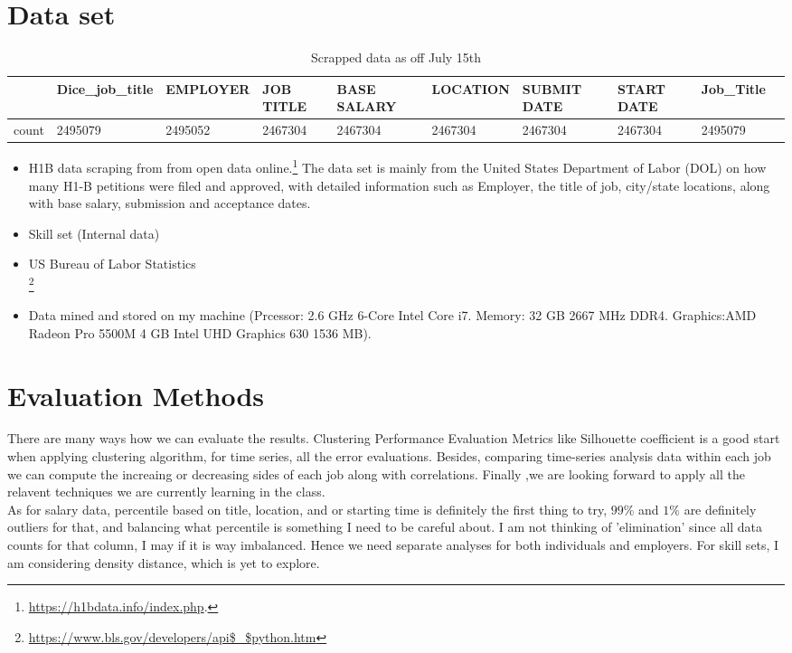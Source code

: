 \section{Data set}
{%
\begin{table*}[h]
	\caption{Scrapped data as off July 15th}
	\begin{tabular}{llllllllll}
		\hline
		{} &   Dice\_job\_title &                           EMPLOYER &        JOB TITLE & BASE SALARY &      LOCATION & SUBMIT DATE &  START DATE &        Job\_Title  \\
		\hline
		count  &          2495079 &                            2495052 &          2467304 &     2467304 &       2467304 &     2467304 &     2467304 &          2495079  \\
		\hline
	\end{tabular}
\end{table*}
}
	\begin{itemize}
	\item 	H1B data  scraping from  from open data online.\footnote{\url{https://h1bdata.info/index.php}.}
	The data set is mainly from the United States Department of Labor (DOL) on how many H1-B petitions were filed and approved, with detailed information such as Employer, the title of  job, city/state locations, along with base salary,  submission and acceptance dates. 
	\item Skill set (Internal data)
	\item US Bureau of Labor Statistics \\
	\footnote{\url{https://www.bls.gov/developers/api$\_$python.htm}
}
	\item Data mined and stored on my machine (Prcessor: 2.6 GHz 6-Core Intel Core i7. Memory: 32 GB 2667 MHz DDR4. Graphics:AMD Radeon Pro 5500M 4 GB
	Intel UHD Graphics 630 1536 MB).
\end{itemize}
\section{ Evaluation Methods }
There are many ways how we can evaluate the results. Clustering Performance Evaluation Metrics like Silhouette coefficient is  a good start when applying clustering algorithm, for time series, all the error evaluations.  Besides, comparing time-series analysis data within each job we can compute the increaing or decreasing sides of each job along with correlations. Finally ,we are looking forward to apply all the relavent techniques we are currently learning in the class.\\
As for salary data, percentile based on title, location, and or starting time is definitely the first thing to try, $99\%$ and $1\%$ are definitely outliers for that, and balancing what percentile is something I need to be careful about. I am not thinking of 'elimination' since all data counts for that column, I may if it is way imbalanced. Hence we need separate analyses for both individuals and employers. For skill sets, I am considering density distance, which is yet to explore.

